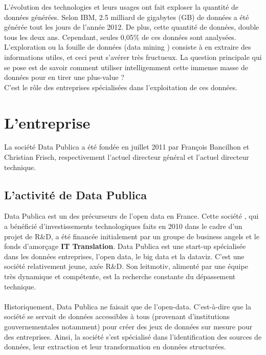 L’évolution des technologies et leurs usages ont fait exploser la quantité de données générées. Selon IBM, 2.5 milliard de gigabytes (GB) de données a été générée tout les jours de l'année 2012. De plus, cette quantité de données, double tous les deux ans. Cependant, seules 0,05\% de ces données sont analysées.\\

L’exploration ou la fouille de données (\og data mining \fg) consiste à en extraire des informations utiles, et ceci peut s’avérer très fructueux. La question principale qui se pose est de savoir comment utiliser intelligemment cette immense masse de données pour en tirer une plus-value ?\\
C’est le rôle des entreprises spécialisées dans l'exploitation de ces données.

\section{L'entreprise}
    La société Data Publica a été fondée en juillet 2011 par François Bancilhon et Christian Frisch, respectivement l'actuel directeur général et l'actuel directeur technique.

    \subsection{L'activité de Data Publica}
        Data Publica est un des précurseurs de l'open data en France. Cette société , qui a bénéficié d’investissements technologiques faits en 2010 dans le cadre d’un projet de R\&D, a été financée initialement par un groupe de business angels et le fonds d’amorçage \textbf{IT Translation}.
        Data Publica est une start-up spécialisée dans les données entreprises, l'open data, le big data et la dataviz. C'est une société relativement jeune, axée R\&D. Son leitmotiv, alimenté par une équipe très dynamique et compétente, est la recherche constante du dépassement technique.

        \paragraph{}
            Historiquement, Data Publica ne faisait que de l'open-data. C'est-à-dire que la société se servait de données accessibles à tous (provenant d'institutions gouvernementales notamment) pour créer des jeux de données sur mesure pour des entreprises. Ainsi, la société s'est spécialisé dans l'identification des sources de données, leur extraction et leur transformation en données structurées.


